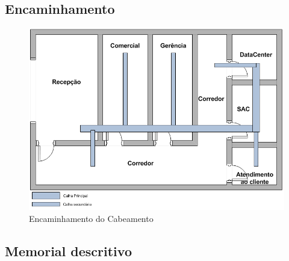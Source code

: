 \documentclass[	DIV=calc,%
							paper=a4,%
							fontsize=12pt,%
							onecolumn]{scrartcl}	 					%
\begin{document}
\subsection{Encaminhamento}

\begin{figure}
	\centering
	\includegraphics[height=\textwidth]{calha}
	\caption{Encaminhamento do Cabeamento}
	\label{calha}
\end{figure}

\subsection{Memorial descritivo}
\end{document}
